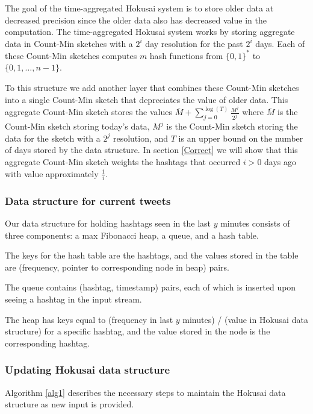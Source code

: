\documentclass[a4paper,12pt]{article}
\begin{document}
The goal of the time-aggregated Hokusai system is to store older data at decreased precision since the older data also has decreased value in the computation.  The time-aggregated Hokusai system works by storing aggregate data in Count-Min sketches with a $2^i$ day resolution for the past $2^i$ days.  Each of these Count-Min sketches computes $m$ hash functions from $\{0,1\}^*$ to $\{0, 1, …, n-1\}$.

To this structure we add another layer that combines these Count-Min sketches into a single Count-Min sketch that depreciates the value of older data.  This aggregate Count-Min sketch stores the values $\bar{M} + \sum\limits_{j=0}^{\log⁡(T)} \frac{M^j}{2^j}$ where $\bar{M}$ is the Count-Min sketch storing today's data, $M^j$ is the Count-Min sketch storing the data for the sketch with a $2^j$ resolution, and $T$ is an upper bound on the number of days stored by the data structure.  In section \ref{Correct} we will show that this aggregate Count-Min sketch weights the hashtags that occurred $i > 0$ days ago with value approximately $\frac{1}{i}$.

\subsubsection{Data structure for current tweets}

Our data structure for holding hashtags seen in the last $y$ minutes consists of three components: a max Fibonacci heap, a queue, and a hash table.

The keys for the hash table are the hashtags, and the values stored in the table are (frequency, pointer to corresponding node in heap) pairs.

The queue contains (hashtag, timestamp) pairs, each of which is inserted upon seeing a hashtag in the input stream.

The heap has keys equal to (frequency in last $y$ minutes) / (value in Hokusai data structure) for a specific hashtag, and the value stored in the node is the corresponding hashtag.

\subsubsection{Updating Hokusai data structure\label{Hokusai}}

Algorithm \ref{alg1} describes the necessary steps to maintain the Hokusai data structure as new input is provided.
\end{document}
